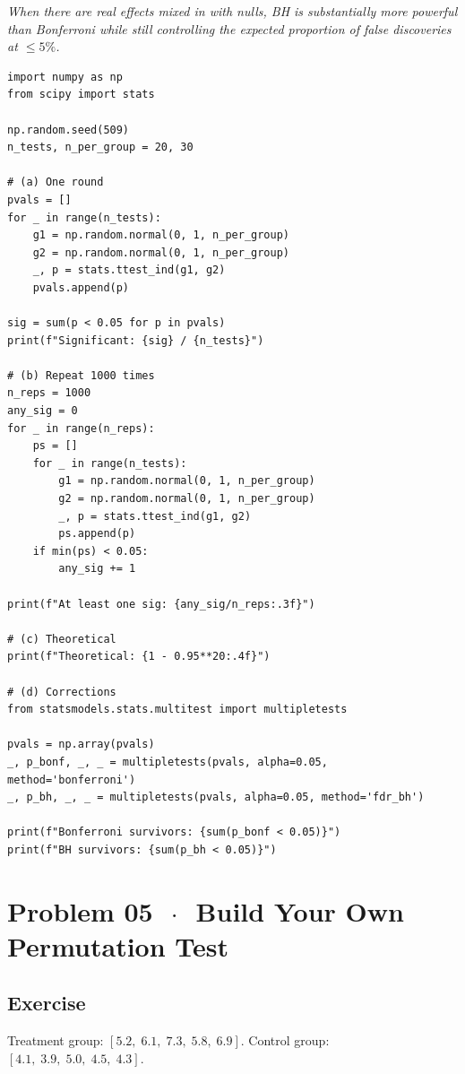 \documentclass[11pt]{article}
\begin{document}
\textit{When there are real effects mixed in with nulls, BH is substantially more powerful than Bonferroni while still controlling the expected proportion of false discoveries at $\leq 5\%$.}

\begin{lstlisting}[style=python]
import numpy as np
from scipy import stats

np.random.seed(509)
n_tests, n_per_group = 20, 30

# (a) One round
pvals = []
for _ in range(n_tests):
    g1 = np.random.normal(0, 1, n_per_group)
    g2 = np.random.normal(0, 1, n_per_group)
    _, p = stats.ttest_ind(g1, g2)
    pvals.append(p)

sig = sum(p < 0.05 for p in pvals)
print(f"Significant: {sig} / {n_tests}")

# (b) Repeat 1000 times
n_reps = 1000
any_sig = 0
for _ in range(n_reps):
    ps = []
    for _ in range(n_tests):
        g1 = np.random.normal(0, 1, n_per_group)
        g2 = np.random.normal(0, 1, n_per_group)
        _, p = stats.ttest_ind(g1, g2)
        ps.append(p)
    if min(ps) < 0.05:
        any_sig += 1

print(f"At least one sig: {any_sig/n_reps:.3f}")

# (c) Theoretical
print(f"Theoretical: {1 - 0.95**20:.4f}")

# (d) Corrections
from statsmodels.stats.multitest import multipletests

pvals = np.array(pvals)
_, p_bonf, _, _ = multipletests(pvals, alpha=0.05, method='bonferroni')
_, p_bh, _, _ = multipletests(pvals, alpha=0.05, method='fdr_bh')

print(f"Bonferroni survivors: {sum(p_bonf < 0.05)}")
print(f"BH survivors: {sum(p_bh < 0.05)}")
\end{lstlisting}

\section*{Problem 05 \texorpdfstring{$\,\cdot\,$}{-} Build Your Own Permutation Test}

\subsection*{Exercise}

Treatment group: $[5.2,\; 6.1,\; 7.3,\; 5.8,\; 6.9]$. Control group: $[4.1,\; 3.9,\; 5.0,\; 4.5,\; 4.3]$.
\end{document}
